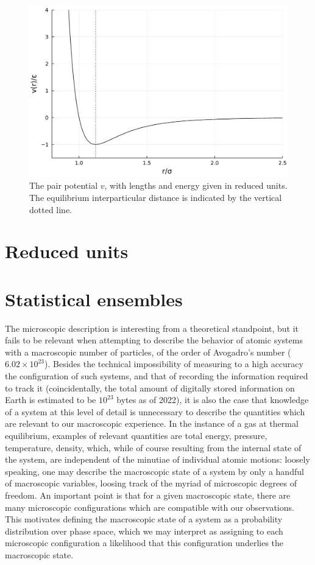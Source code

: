  \begin{figure}[htbp]
    \begin{center}
      \includegraphics[width=0.7\linewidth]{figures/chapter1/lennard_jones.pdf}
      \caption{ \label{fig:lennard_jones}
        The pair potential $v$, with lengths and energy given in reduced units. The equilibrium interparticular distance is indicated by the vertical dotted line.
      }
    \end{center}
  \end{figure}

\section{Reduced units}

\section{Statistical ensembles}
The microscopic description is interesting from a theoretical standpoint, but it fails to be relevant when attempting to describe the behavior of atomic systems with a macroscopic number of particles, of the order of Avogadro's number ($6.02 \times 10^{23} $).
Besides the technical impossibility of measuring to a high accuracy the configuration of such systems, and that of recording the information required to track it (coincidentally, the total amount of digitally stored information on Earth is estimated to be $10^{23}$ bytes as of 2022), it is also the case that knowledge of a system at this level of detail is unnecessary to describe the quantities which are relevant to our macroscopic experience.
In the instance of a gas at thermal equilibrium, examples of relevant quantities are total energy, pressure, temperature, density, which, while of course resulting from the internal state of the system, are independent of the minutiae of individual atomic motions: loosely speaking, one may describe the macroscopic state of a system by only a handful of macroscopic variables, loosing track of the myriad of microscopic degrees of freedom.
An important point is that for a given macroscopic state, there are many microscopic configurations which are compatible with our observations. This motivates defining the macroscopic state of a system as a probability distribution over phase space, which we may interpret as assigning to each microscopic configuration a likelihood that this configuration underlies the macroscopic state.

